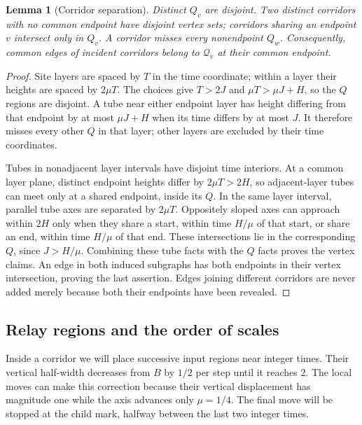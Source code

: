 \documentclass[11pt]{article}
\newtheorem{lemma}[theorem]{Lemma}
\theoremstyle{definition}
\begin{document}
\begin{lemma}[Corridor separation]\label{lem:corridors}
Distinct $Q_v$ are disjoint. Two distinct corridors with no common
endpoint have disjoint vertex sets; corridors sharing an endpoint $v$
intersect only in $Q_v$. A corridor misses every nonendpoint $Q_w$.
Consequently, common edges of incident corridors belong to
$\mathcal Q_v$ at their common endpoint.
\end{lemma}

\begin{proof}
Site layers are spaced by $T$ in the time coordinate; within a layer
their heights are spaced by $2\mu T$. The choices give
$T>2J$ and $\mu T>\mu J+H$, so the $Q$ regions are disjoint.
A tube near either endpoint layer has height differing from that
endpoint by at most $\mu J+H$ when its time differs by at most $J$.
It therefore misses every other $Q$ in that layer; other layers are
excluded by their time coordinates.

Tubes in nonadjacent layer intervals have disjoint time interiors.
At a common layer plane, distinct endpoint heights differ by
$2\mu T>2H$, so adjacent-layer tubes can meet only at a shared
endpoint, inside its $Q$. In the same layer interval, parallel tube
axes are separated by $2\mu T$. Oppositely sloped axes can approach
within $2H$ only when they share a start, within time $H/\mu$ of
that start, or share an end, within time $H/\mu$ of that end.
These intersections lie in the corresponding $Q$, since $J>H/\mu$.
Combining these tube facts with the $Q$ facts proves the vertex claims.
An edge in both induced subgraphs has both endpoints in their vertex
intersection, proving the last assertion. Edges joining different
corridors are never added merely because both their endpoints have
been revealed.
\end{proof}

\subsection{Relay regions and the order of scales}
\label{subsec:corridor-scales}

Inside a corridor we will place successive input regions near integer
times. Their vertical half-width decreases from $B$ by $1/2$ per step
until it reaches $2$. The local moves can make this correction because
their vertical displacement has magnitude one while the axis advances
only $\mu=1/4$. The final move will be stopped at the child mark,
halfway between the last two integer times.
\end{document}
